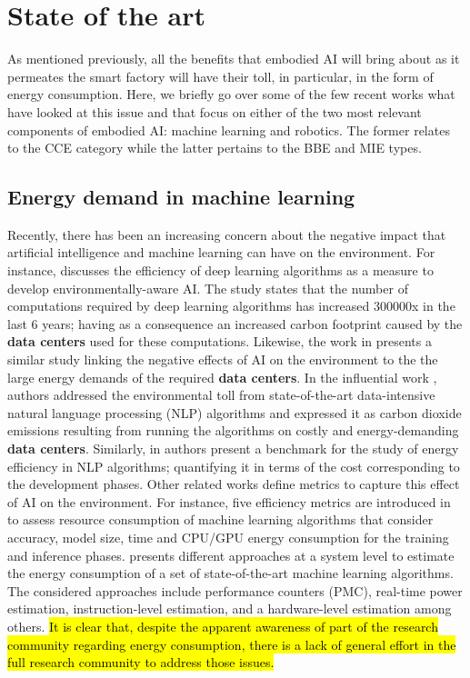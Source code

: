 \section{State of the art}
As mentioned previously, all the benefits that embodied AI will bring about as it permeates the smart factory will have their toll, in particular, in the form of energy consumption. Here, we briefly go over some of the few recent works what have looked at this issue and that focus on either of the two most relevant components of embodied AI: machine learning and robotics. The former relates to the CCE category while the latter pertains to the BBE and MIE types.

\subsection{Energy demand in machine learning}
Recently, there has been an increasing concern about the negative impact that artificial intelligence and machine learning can have on the environment. For instance, \cite{schwartz2019green} discusses the efficiency of deep learning algorithms as a measure to develop environmentally-aware AI. The study states that the number of computations required by deep learning algorithms has increased 300000x in the last 6 years; having as a consequence an increased carbon footprint caused by the \textbf{data centers} used for these computations. Likewise, the work in \cite{vinuesa2020role} presents a similar study linking the negative effects of AI on the environment to the the large energy demands of the required \textbf{data centers}. In the influential work \cite{Strubell2019EnergyAP}, authors addressed the environmental toll from state-of-the-art data-intensive natural language processing (NLP) algorithms and expressed it as carbon dioxide emissions resulting from running the algorithms on costly and energy-demanding \textbf{data centers}. Similarly, in \cite{zhou2020hulk} authors present a benchmark for the study of energy efficiency in NLP algorithms; quantifying it in terms of the cost corresponding to the development phases. Other related works define metrics to capture this effect of AI on the environment. For instance, five efficiency metrics are introduced in \cite{Dalgren2019GreenMLA} to assess resource consumption of machine learning algorithms that consider accuracy, model size, time and CPU/GPU energy consumption for the training and inference phases. \cite{garcia2019estimation} presents different approaches at a system level to estimate the energy consumption of a set of state-of-the-art machine learning algorithms. The considered approaches include performance counters (PMC), real-time power estimation, instruction-level estimation, and a hardware-level estimation among others. \hl{It is clear that, despite the apparent awareness of part of the research community regarding energy consumption, there is a lack of general effort in the full research community to address those issues.}   


